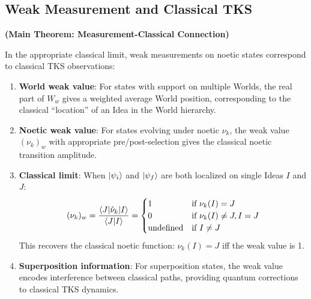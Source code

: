 \subsection{Weak Measurement and Classical TKS}

\begin{theorem}
\label{thm:weak-classical}
\textbf{(Main Theorem: Measurement-Classical Connection)}

In the appropriate classical limit, weak measurements on noetic states correspond to classical TKS observations:
\begin{enumerate}
  \item \textbf{World weak value}: For states with support on multiple Worlds, the real part of $W_w$ gives a weighted average World position, corresponding to the classical ``location'' of an Idea in the World hierarchy.

  \item \textbf{Noetic weak value}: For states evolving under noetic $\nu_k$, the weak value $(\nu_k)_w$ with appropriate pre/post-selection gives the classical noetic transition amplitude.

  \item \textbf{Classical limit}: When $|\psi_i\rangle$ and $|\psi_f\rangle$ are both localized on single Ideas $I$ and $J$:
  \[
  (\nu_k)_w = \frac{\langle J|\hat{\nu}_k|I\rangle}{\langle J|I\rangle} = \begin{cases} 1 & \text{if } \nu_k(I) = J \\ 0 & \text{if } \nu_k(I) \neq J, I = J \\ \text{undefined} & \text{if } I \neq J \end{cases}
  \]
  This recovers the classical noetic function: $\nu_k(I) = J$ iff the weak value is 1.

  \item \textbf{Superposition information}: For superposition states, the weak value encodes interference between classical paths, providing quantum corrections to classical TKS dynamics.
\end{enumerate}
\end{theorem}


